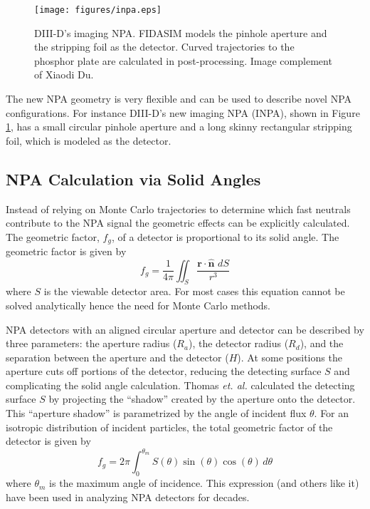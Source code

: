 \begin{figure}[h!]
    \centering
    \texttt{[image: figures/inpa.eps]}
    \caption{DIII-D's imaging NPA. FIDASIM models the pinhole aperture and the stripping foil as the detector. Curved trajectories to the phosphor plate are calculated in post-processing. Image complement of Xiaodi Du.}
    \label{fig:inpa}
\end{figure}
The new NPA geometry is very flexible and can be used to describe novel NPA configurations. For instance DIII-D's new imaging NPA (INPA)\cite{du2018inpa}, shown in Figure \ref{fig:inpa}, has a small circular pinhole aperture and a long skinny rectangular stripping foil, which is modeled as the detector.\cite{du2018inpa}

\subsection{NPA Calculation via Solid Angles}
Instead of relying on Monte Carlo trajectories to determine which fast neutrals contribute to the NPA signal the geometric effects can be explicitly calculated\cite{stagner2014geometric}.
The geometric factor, $f_g$, of a detector is proportional to its solid angle. The geometric factor is given by
\begin{equation}
\label{eq:solid_angle}
f_g = \frac{1}{4\pi} \iint_S \frac{\mathbf{r}\cdot\hat{\mathbf{n}}\,\,dS}{r^3}
\end{equation} 
where $S$ is the viewable detector area. For most cases this equation cannot be solved analytically hence the need for Monte Carlo methods.

NPA detectors with an aligned circular aperture and detector can be described by three parameters: the aperture radius ($R_a$), the detector radius ($R_d$), and the separation between the aperture and the detector ($H$). At some positions the aperture cuts off portions of the detector, reducing the detecting surface $S$ and complicating the solid angle calculation. Thomas \emph{et. al.} \cite{thomas1972analytical} calculated the detecting surface $S$ by projecting the ``shadow'' created by the aperture onto the detector. This ``aperture shadow'' is parametrized by the angle of incident flux $\theta$. For an isotropic distribution of incident particles, the total geometric factor of the detector is given by
\begin{equation}
\label{eq:tot_gf}
f_g= 2\pi\int_0^{\theta_{m}}S(\theta)\sin(\theta)\cos(\theta)\,d\theta
\end{equation}
where $\theta_{m}$ is the maximum angle of incidence. This expression (and others like it) have been used in analyzing NPA detectors for decades. 

